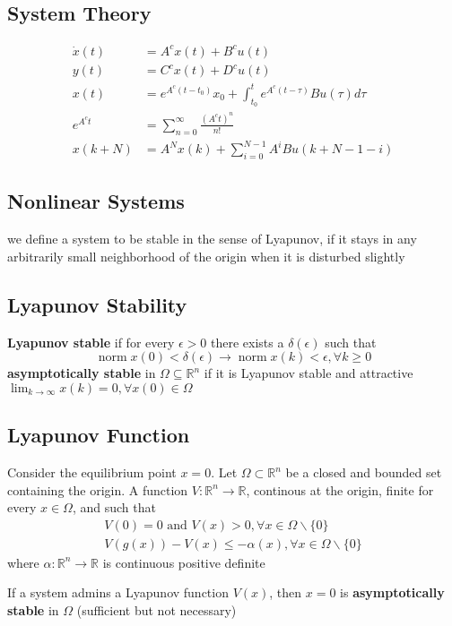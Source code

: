 \documentclass[landscape,a4paper,8pt]{scrartcl}
\newcommand{\R}{\mathbb R}
\DeclareMathOperator\norm{norm}
\begin{document}
\raggedright

\begin{multicols*}{3}
\section{System Theory}
\begin{align*}
\dot{x}(t) &= A^cx(t)+B^cu(t)\\
y(t) &= C^cx(t) + D^cu(t)\\
x(t) &= e^{A^c(t-t_0)}x_0+\int_{t_0}^te^{A^c(t-\tau)}Bu(\tau)d\tau \\
e^{A^ct}&=\sum_{n=0}^\infty\frac{(A^ct)^n}{n!} \\
x(k+N)&=A^Nx(k)+\sum_{i=0}^{N-1}A^iBu(k+N-1-i)
\end{align*}

\subsection{Nonlinear Systems}
we define a system to be stable in the sense of Lyapunov, if it stays in any arbitrarily small neighborhood of the origin when it is disturbed slightly
\subsection{Lyapunov Stability}
\textbf{Lyapunov stable} if for every $\epsilon > 0$ there exists a $\delta(\epsilon)$ such that
\[ \norm{x(0)}<\delta(\epsilon)\to \norm{x(k)} < \epsilon, \forall k \geq 0 \]
\textbf{asymptotically stable} in $\Omega\subseteq \R^n$ if it is Lyapunov stable and attractive $\lim_{k\to\infty}x(k)=0, \forall x(0)\in \Omega$
\subsection{Lyapunov Function}
Consider the equilibrium point $x=0$. Let $\Omega\subset\R^n$ be a closed and bounded set containing the origin. A function $V:\R^n\to \R$, continous at the origin, finite for every $x\in \Omega$, and such that 
\begin{align*}
V(0)=0 \text{ and } V(x)>0, \forall x\in \Omega \backslash \{0\}\\
V(g(x))-V(x)\leq -\alpha(x), \forall x\in\Omega\backslash \{0\}
\end{align*}
where $\alpha:\R^n\to\R$ is continuous positive definite

If a system admins a Lyapunov function $V(x)$, then $x=0$ is \textbf{asymptotically stable} in $\Omega$ (sufficient but not necessary)


\end{multicols*}
\end{document}
